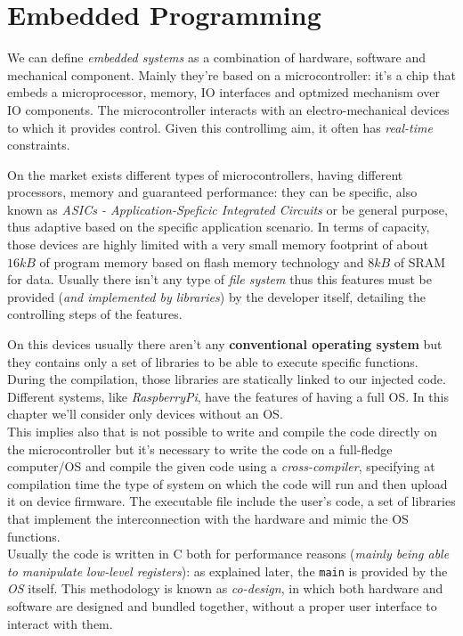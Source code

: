 \documentclass[10pt,a4paper]{report}
\theoremstyle{definition}
\begin{document}
\chapter{Embedded Programming}\label{sec:embedded-programming}
We can define \textit{embedded systems} as a combination of hardware, software and mechanical component. Mainly they're based on a microcontroller: it's a chip that embeds a microprocessor, memory, IO interfaces and optmized mechanism over IO components.
The microcontroller interacts with an electro-mechanical devices to which it provides control. Given this controllimg aim, it often has \textit{real-time} constraints.

On the market exists different types of microcontrollers, having different processors, memory and guaranteed performance: they can be specific, also known as \textit{ASICs - Application-Speficic Integrated Circuits} or be general purpose, thus adaptive based on the specific application scenario.
In terms of capacity, those devices are highly limited with a very small memory footprint of about $16kB$ of program memory based on flash memory technology and $8kB$ of SRAM for data. Usually there isn't any type of \textit{file system} thus this features must be provided (\textit{and implemented by libraries}) by the developer itself, detailing the controlling steps of the features.

On this devices usually there aren't any \textbf{conventional operating system} but they contains only a set of libraries to be able to execute specific functions. During the compilation, those libraries are statically linked to our injected code. Different systems, like \textit{RaspberryPi}, have the features of having a full OS.  In this chapter we'll consider only devices without an OS.\\
This implies also that is not possible to write and compile the code directly on the microcontroller but it's necessary to write the code on a full-fledge computer/OS and compile the given code using a \textit{cross-compiler}, specifying at compilation time the type of system on which the code will run and then upload it on device firmware.
The executable file include the user's code, a set of libraries that implement the interconnection with the hardware and mimic the OS functions. \\

Usually the code is written in C both for performance reasons (\textit{mainly being able to manipulate low-level registers}): as explained later, the \texttt{main} is provided by the \textit{OS} itself.
This methodology is known as \textit{co-design}, in which both hardware and software are designed and bundled together, without a proper user interface to interact with them.
\end{document}
